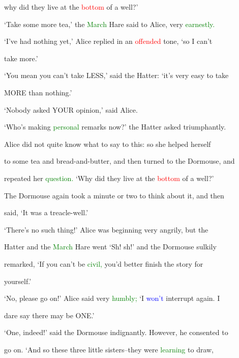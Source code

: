 why did they live at the \textcolor{red}{bottom} of a well?’



 ‘Take some more tea,’ the \textcolor{green}{March} Hare said to Alice, very \textcolor{green}{earnestly.}



 ‘I’ve had nothing yet,’ Alice replied in an \textcolor{red}{offended} tone, ‘so I can’t

 take more.’



 ‘You mean you can’t take LESS,’ said the Hatter: ‘it’s very easy to take

 MORE than nothing.’



 ‘Nobody asked YOUR opinion,’ said Alice.



 ‘Who’s making \textcolor{green}{personal} remarks now?’ the Hatter asked triumphantly.



 Alice did not quite know what to say to this: so she helped herself

 to some tea and bread-and-butter, and then turned to the Dormouse, and

 repeated her \textcolor{green}{question.} ‘Why did they live at the \textcolor{red}{bottom} of a well?’



 The Dormouse again took a minute or two to think about it, and then

 said, ‘It was a treacle-well.’



 ‘There’s no such thing!’ Alice was beginning very angrily, but the

 Hatter and the \textcolor{green}{March} Hare went ‘Sh! sh!’ and the Dormouse sulkily

 remarked, ‘If you can’t be \textcolor{green}{civil,} you’d better finish the story for

 yourself.’



 ‘No, please go on!’ Alice said very \textcolor{green}{humbly;} ‘I \textcolor{blue}{won’t} \textcolor{BurntOrange}{interrupt} again. I

 \textcolor{BurntOrange}{dare} say there may be ONE.’



 ‘One, indeed!’ said the Dormouse indignantly. However, he consented to

 go on. ‘And so these three little sisters--they were \textcolor{green}{learning} to draw,

